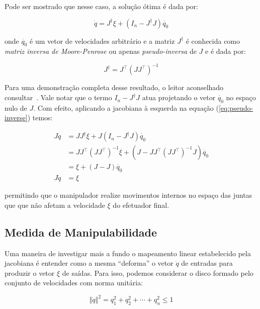 Pode ser mostrado que nesse caso, a solução ótima é dada por:

\begin{equation}\label{eq:pseudo-inverse}
    \dot{q} = J^\dag \xi + (I_n - J^\dag J) \dot{q_0}
\end{equation}

onde \(\dot{q_0}\) é um vetor de velocidades arbitrário e a matriz \(J^\dag\) é
conhecida como \emph{matriz inversa de Moore-Penrose} ou apenas
\emph{pseudo-inversa} de \(J\) e é dada por:

\begin{equation}
    J^\dag = J^\top {(J J^\top)}^{-1}
\end{equation}

Para uma demonstração completa desse resultado, o leitor aconselhado consultar~\cite[p. 124 -- 125]{siciliano_robotics_2009}.
Vale notar que o termo \(I_n - J^\dag J\) atua projetando o vetor \(\dot{q_0}\)
no espaço nulo de \(J\). Com efeito, aplicando a jacobiana à esquerda na
equação (\ref{eq:pseudo-inverse}) temos:

\begin{align*}
    J \dot{q} & = J J^\dag \xi + J (I_n - J^\dag J) \dot{q_0}                                   \\
              & = J J^\top {(J J^\top)}^{-1} \xi + (J - J J^\top {(J J^\top)}^{-1} J) \dot{q_0} \\
              & = \xi + (J - J) \dot{q_0}                                                       \\
    J \dot{q} & = \xi
\end{align*}

permitindo que o manipulador realize movimentos internos no espaço das juntas
que que não afetam a velocidade \(\xi\) do efetuador final.

\subsection{Medida de Manipulabilidade}

Uma maneira de investigar mais a fundo o mapeamento linear estabelecido pela
jacobiana é entender como a mesma ``deforma'' o vetor \(\dot{q}\) de entradas
para produzir o vetor \(\xi\) de saídas. Para isso, podemos considerar o disco
formado pelo conjunto de velocidades com norma unitária:

\begin{equation}
    \left\Vert \dot{q} \right\Vert^2 = q_1^2 + q_2^2 + \cdots + q_n^2 \leq 1
\end{equation}

